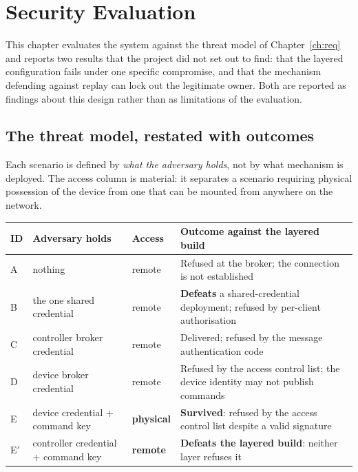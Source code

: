 \chapter{Security Evaluation}\label{ch:security}

This chapter evaluates the system against the threat model of Chapter~\ref{ch:req} and
reports two results that the project did not set out to find: that the layered configuration
fails under one specific compromise, and that the mechanism defending against replay can lock out
the legitimate owner. Both are reported as findings about this design rather than as
limitations of the evaluation.

\section{The threat model, restated with outcomes}

Each scenario is defined by \emph{what the adversary holds}, not by what mechanism is deployed.
The access column is material: it separates a scenario requiring physical possession of the
device from one that can be mounted from anywhere on the network.

\begin{longtable}{@{}p{}p{}p{}p{}@{}}
\toprule
\textbf{ID} & \textbf{Adversary holds} & \textbf{Access} & \textbf{Outcome against the layered
build} \\
\midrule
\endhead
A & nothing                     & remote   & Refused at the broker; the connection is not
established \\
B & the one shared credential   & remote   & \textbf{Defeats} a shared-credential deployment;
refused by per-client authorisation \\
C & controller broker credential& remote   & Delivered; refused by the message authentication
code \\
D & device broker credential    & remote   & Refused by the access control list; the device
identity may not publish commands \\
E & device credential + command key & \textbf{physical} & \textbf{Survived}: refused by the
access control list despite a valid signature \\
E$'$ & controller credential + command key & \textbf{remote} & \textbf{Defeats the layered
build}: neither layer refuses it \\
\bottomrule
\end{longtable}

